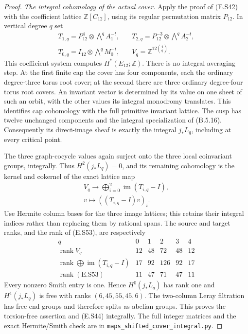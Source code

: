 \begin{proof}
\emph{The integral cohomology of the actual cover.}
Apply the proof of (E.S42) with the coefficient lattice
$\mathbb Z[C_{12}]$, using its regular permutation matrix
$P_{12}$. In vertical degree $q$ set
\[
 \begin{aligned}
 T_{1,q}=P_{12}^4\otimes\bigwedge^q A_1^{-t},\quad
 &T_{2,q}=P_{12}^{-3}\otimes\bigwedge^q A_2^{-t},\\
 T_{0,q}=I_{12}\otimes\bigwedge^q M_0^{-t},
 &V_q=\mathbb Z^{12\binom4q}.
 \end{aligned}
 \tag{E.S52}
\]
This coefficient system computes $H^*(E_{12};\mathbb Z)$.
There is no integral averaging step. At the first finite
cap the cover has four components, each the ordinary
degree-three torus root cover; at the second there are
three ordinary degree-four torus root covers. An invariant
vector is determined by its value on one sheet of such
an orbit, with the other values its integral monodromy
translates. This identifies cap cohomology with the full
primitive invariant lattice. The cusp has twelve unchanged
components and the integral specialization of (B.5.16).
Consequently its direct-image sheaf is exactly the integral
$j_*L_q$, including at every critical point.

The three graph-cocycle values again surject onto the
three local coinvariant groups, integrally. Thus $H^2(j_*L_q)=0$,
and its remaining cohomology is the kernel and cokernel
of the exact lattice map
\[
 \begin{gathered}
 V_q\longrightarrow
        \bigoplus_{i=0}^2\operatorname{im}(T_{i,q}-I),\\
           v\longmapsto((T_{i,q}-I)v)_i.
 \end{gathered}
 \tag{E.S53}
\]
Use Hermite column bases for the three image lattices;
this retains their integral indices rather than replacing
them by rational spans. The source and target ranks,
and the rank of (E.S53), are respectively
\[
 \begin{array}{c|rrrrr}
 q&0&1&2&3&4\\ \hline
 \operatorname{rank}V_q&12&48&72&48&12\\
 \operatorname{rank}\bigoplus\operatorname{im}(T_{i,q}-I)
                      &17&92&126&92&17\\
 \operatorname{rank}(\text{E.S53})&11&47&71&47&11
 \end{array}
 \tag{E.S54}
\]
Every nonzero Smith entry is one. Hence $H^0(j_*L_q)$
has rank one and $H^1(j_*L_q)$ is free with ranks
$(6,45,55,45,6)$. The two-column Leray filtration has
free end groups and therefore splits as abelian groups.
This proves the torsion-free assertion and (E.S44)
integrally. The full integer matrices and the exact
Hermite/Smith check are in
\texttt{maps\_shifted\_cover\_integral.py}.


\end{proof}
